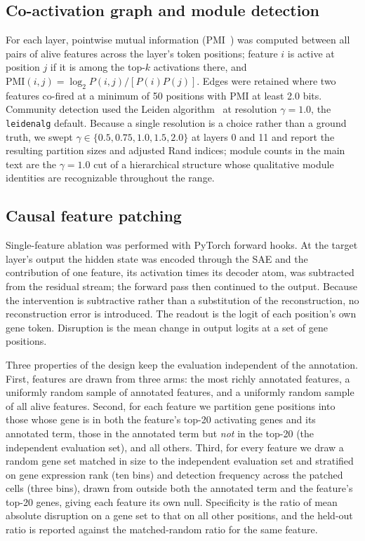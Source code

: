\subsection*{Co-activation graph and module detection}

For each layer, pointwise mutual information (PMI~\cite{manning1999foundations}) was computed
between all pairs of alive features across the layer's token positions; feature $i$ is active at
position $j$ if it is among the top-$k$ activations there, and
$\text{PMI}(i,j) = \log_2 P(i,j) / [P(i)P(j)]$. Edges were retained where two features co-fired at
a minimum of 50 positions with PMI at least 2.0 bits. Community detection used the Leiden algorithm~\cite{traag2019louvain} at
resolution $\gamma = 1.0$, the \texttt{leidenalg} default. Because a single resolution is a choice
rather than a ground truth, we swept $\gamma \in \{0.5, 0.75, 1.0, 1.5, 2.0\}$ at layers 0 and 11
and report the resulting partition sizes and adjusted Rand indices; module counts in the main text
are the $\gamma{=}1.0$ cut of a hierarchical structure whose qualitative module identities are
recognizable throughout the range.

\subsection*{Causal feature patching}

Single-feature ablation was performed with PyTorch forward hooks. At the target layer's output the hidden
state was encoded through the SAE and the contribution of one feature, its activation times its
decoder atom, was subtracted from the residual stream; the forward pass then continued to the
output. Because the intervention is subtractive rather than a substitution of the reconstruction,
no reconstruction error is introduced. The readout is the logit of each position's own gene token. Disruption is the
mean change in output logits at a set of gene positions.

Three properties of the design keep the evaluation independent of the annotation. First, features
are drawn from three arms: the most richly annotated features, a uniformly random sample of
annotated features, and a uniformly random sample of all alive features. Second, for each feature we
partition gene positions into those whose gene is in both the feature's top-20 activating genes and
its annotated term, those in the annotated term but \emph{not} in the top-20 (the independent
evaluation set), and all others. Third, for every feature we draw a random gene set matched in size to the independent evaluation
set and stratified on gene expression rank (ten bins) and detection frequency across the patched
cells (three bins), drawn from outside both the annotated term and the feature's top-20 genes,
giving each feature its own null.
Specificity is the ratio of mean absolute disruption on a gene set to that on all other positions,
and the held-out ratio is reported against the matched-random ratio for the same feature.


